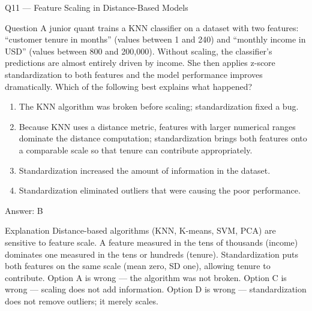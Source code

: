 \documentclass[aspectratio=169,8pt]{beamer}
\begin{document}
	\begin{frame}{Q11 --- Feature Scaling in Distance-Based Models}
		\begin{block}{Question}
			A junior quant trains a KNN classifier on a dataset with two features: ``customer tenure in months'' (values between 1 and 240) and ``monthly income in USD'' (values between 800 and 200,000). Without scaling, the classifier's predictions are almost entirely driven by income. She then applies z-score standardization to both features and the model performance improves dramatically. Which of the following best explains what happened?
		\end{block}
		\begin{enumerate}
			\item The KNN algorithm was broken before scaling; standardization fixed a bug.
			\item Because KNN uses a distance metric, features with larger numerical ranges dominate the distance computation; standardization brings both features onto a comparable scale so that tenure can contribute appropriately.
			\item Standardization increased the amount of information in the dataset.
			\item Standardization eliminated outliers that were causing the poor performance.
		\end{enumerate}
		\begin{exampleblock}{Answer: B}\end{exampleblock}
		\begin{block}{Explanation}
			Distance-based algorithms (KNN, K-means, SVM, PCA) are sensitive to feature scale. A feature measured in the tens of thousands (income) dominates one measured in the tens or hundreds (tenure). Standardization puts both features on the same scale (mean zero, SD one), allowing tenure to contribute. Option A is wrong --- the algorithm was not broken. Option C is wrong --- scaling does not add information. Option D is wrong --- standardization does not remove outliers; it merely scales.
		\end{block}
	\end{frame}
	
\end{document}
